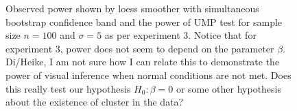 \documentclass{article}
\begin{document}


\begin{figure}[hbtp]
   \centering
       \caption{Observed power shown by loess smoother with simultaneous bootstrap confidence band and the power of UMP test for sample size $n= 100$ and $\sigma = 5$ as per experiment 3. Notice that for experiment 3, power does not seem to depend on the parameter $\beta$. Di/Heike, I am not sure how I can relate this to demonstrate the power of visual inference when normal conditions are not met. Does this really test our hypothesis $H_0: \beta=0$ or some other hypothesis about the existence of cluster in the data?}
       \label{fig:power_loess3}
\end{figure}

\end{document}
